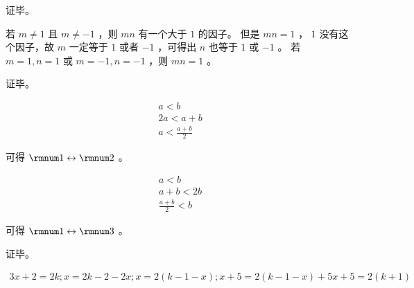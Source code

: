{{\begin{practices}
            证毕。
        \end{practices}

        \begin{practices}
            若 $m \neq 1$ 且 $m \neq -1$ ，则 $mn$ 有一个大于 $1$ 的因子。
            但是 $mn = 1$ ， $1$ 没有这个因子，故 $m$ 一定等于 $1$ 或者 $-1$ ，可得出 $n$ 也等于 $1$ 或 $-1$ 。
            若 $m = 1, n = 1$ 或 $m = -1, n = -1$ ，则 $mn = 1$ 。

            证毕。
        \end{practices}

        \begin{practices}
            \begin{align*}
                a < b \\
                2a < a + b \\
                a < \frac{a + b}{2}
            \end{align*}

            可得 $\rmnum 1 \leftrightarrow \rmnum 2$ 。

            \begin{align*}
                a < b \\
                a + b < 2b \\
                \frac{a + b}{2} < b
            \end{align*}

            可得 $\rmnum 1 \leftrightarrow \rmnum 3$ 。

            证毕。
        \end{practices}

        \begin{practices}
            \begin{align*}
                3x + 2 = 2k;
                x = 2k - 2 - 2x;
                x = 2(k - 1 - x);

                x + 5 = 2(k - 1 - x) + 5
                x + 5 = 2(k + 1)
            \end{align*}
        \end{practices}
    }
}
